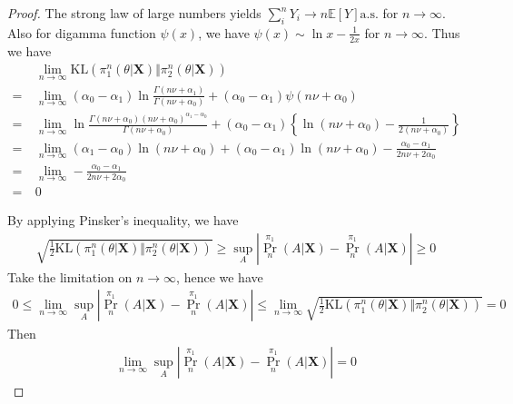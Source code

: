 \begin{proof}
The strong law of large numbers yields $\sum_{i}^{n}Y_i \rightarrow n\mathbb{E} [Y] \mathrm{a.s.}$ for $n\rightarrow \infty$. Also for digamma function $\psi(x)$, we have $\psi(x) \sim \ln x - \frac{1}{2x}$ for $n\rightarrow \infty$. Thus we have
\begin{align*}
    &\lim_{n\rightarrow\infty} \mathrm{KL}\left( \pi_1^{n}(\theta \vert \bm{X}) \Vert \pi_2^{n}(\theta \vert \bm{X})\right)\\
=\ & \lim_{n\rightarrow\infty} (\alpha_0 - \alpha_1)
        \ln \frac{\Gamma(n\nu+\alpha_1)}{\Gamma(n\nu+\alpha_0)} +
        (\alpha_0 - \alpha_1)\psi(n\nu+\alpha_0)\\
=\ & \lim_{n\rightarrow\infty} 
        \ln \frac{\Gamma(n\nu+\alpha_0)(n\nu+\alpha_0)^{\alpha_1 - \alpha_0}}{\Gamma(n\nu+\alpha_0)} + 
        (\alpha_0 - \alpha_1) \left\{ \ln (n\nu + \alpha_0) - \frac{1}{2(n\nu + \alpha_0)} \right\}\\
=\ & \lim_{n\rightarrow\infty} 
        (\alpha_1 - \alpha_0) \ln (n\nu + \alpha_0) + (\alpha_0 - \alpha_1) \ln(n\nu + \alpha_0) 
        - \frac{\alpha_0 - \alpha_1}{2n\nu + 2\alpha_0}\\
=\ & \lim_{n\rightarrow\infty} 
        - \frac{\alpha_0 - \alpha_1}{2n\nu + 2\alpha_0}\\
=\ & 0
\end{align*}

By applying Pinsker's inequality, we have
\begin{align*}
    \sqrt{\frac{1}{2}\mathrm{KL}\left( \pi_1^{n}(\theta \vert \bm{X}) \Vert \pi_2^{n}(\theta \vert \bm{X})\right)} \geq \sup_A \left\vert \Pr^{\pi_1}_n(A \vert \bm{X}) - \Pr^{\pi_1}_n(A \vert \bm{X}) \right\vert
    \geq 0
\end{align*}
Take the limitation on $n \rightarrow \infty$,  hence we have
\begin{align*}
    0 \leq
    \lim_{n\rightarrow\infty} \sup_A \left\vert \Pr^{\pi_1}_n(A \vert \bm{X}) - \Pr^{\pi_1}_n(A \vert \bm{X}) \right\vert
    \leq
    \lim_{n\rightarrow\infty} \sqrt{\frac{1}{2}\mathrm{KL}\left( \pi_1^{n}(\theta \vert \bm{X}) \Vert \pi_2^{n}(\theta \vert \bm{X})\right)} = 0
\end{align*}
Then
\begin{align*}
    \lim_{n\rightarrow\infty} \sup_A \left\vert \Pr^{\pi_1}_n(A \vert \bm{X}) - \Pr^{\pi_1}_n(A \vert \bm{X}) \right\vert
    = 0
\end{align*}
\end{proof}